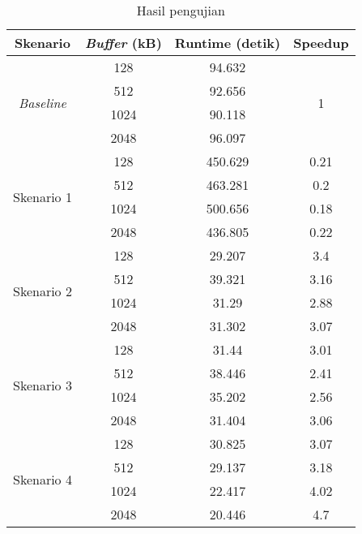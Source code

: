 \begin {table}[h]
\begin{center}
\caption {Hasil pengujian}

    \begin{tabular}{|c|c|c|c|}

    \hline
    \rowcolor{gray!10}
    Skenario & \emph{Buffer} (kB) & Runtime (detik) & Speedup \\
    \hline

    \multirow{4}{*}{\emph{Baseline}} & 128 & 94.632 & \multirow{4}{*}{1} \\
    \cline{2-3}
    & 512 & 92.656 & \\
    \cline{2-3}
    & 1024 & 90.118 & \\
    \cline{2-3}
    & 2048 & 96.097 & \\
    \hline
    
    \multirow{4}{*}{Skenario 1} & 128 & 450.629 & 0.21 \\
    \cline{2-4}
    & 512 & 463.281 & 0.2 \\
    \cline{2-4}
    & 1024 & 500.656 & 0.18 \\
    \cline{2-4}
    & 2048 & 436.805 & 0.22 \\
    \hline
    
    \multirow{4}{*}{Skenario 2} & 128 & 29.207 & 3.4 \\
    \cline{2-4}
    & 512 & 39.321 & 3.16 \\
    \cline{2-4}
    & 1024 & 31.29 & 2.88 \\
    \cline{2-4}
    & 2048 & 31.302 & 3.07 \\
    \hline
    
    \multirow{4}{*}{Skenario 3} & 128 & 31.44 & 3.01 \\
    \cline{2-4}
    & 512 & 38.446 & 2.41 \\
    \cline{2-4}
    & 1024 & 35.202 & 2.56 \\
    \cline{2-4}
    & 2048 & 31.404 & 3.06 \\
    \hline

    \multirow{4}{*}{Skenario 4} & 128 & 30.825 & 3.07 \\
    \cline{2-4}
    & 512 & 29.137 & 3.18 \\
    \cline{2-4}
    & 1024 & 22.417 & 4.02 \\
    \cline{2-4}
    & 2048 & 20.446 & 4.7 \\
    \hline

    \end{tabular}

\end{center}
\end{table}

